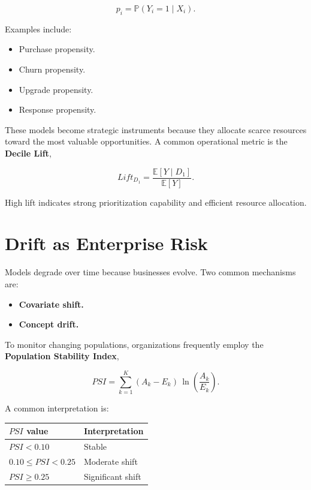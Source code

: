 \documentclass[
  a4paper,
  DIV=11,
  numbers=noendperiod]{scrartcl}
\newcounter{none} %
\providecommand{\tightlist}{%
  \setlength{\itemsep}{0pt}\setlength{\parskip}{0pt}}
\begin{document}
\[
p_i = \mathbb{P}(Y_i = 1 \mid X_i).
\]

Examples include:

\begin{itemize}
\tightlist
\item
  Purchase propensity.
\item
  Churn propensity.
\item
  Upgrade propensity.
\item
  Response propensity.
\end{itemize}

These models become strategic instruments because they allocate scarce
resources toward the most valuable opportunities. A common operational
metric is the \textbf{Decile Lift},

\[
Lift_{D_1} = \frac{\mathbb{E}[Y \mid D_1]}{\mathbb{E}[Y]}.
\]

High lift indicates strong prioritization capability and efficient
resource allocation.

\section{Drift as Enterprise Risk}\label{drift-as-enterprise-risk}

Models degrade over time because businesses evolve. Two common
mechanisms are:

\begin{itemize}
\tightlist
\item
  \textbf{Covariate shift.}
\item
  \textbf{Concept drift.}
\end{itemize}

To monitor changing populations, organizations frequently employ the
\textbf{Population Stability Index},

\[
PSI = \sum_{k=1}^{K} (A_k - E_k)\,
      \ln\!\left( \frac{A_k}{E_k} \right).
\]

A common interpretation is:

{\def\LTcaptype{none} %
\begin{longtable}[]{@{}ll@{}}
\toprule\noalign{}
\(PSI\) value & Interpretation \\
\midrule\noalign{}
\endhead
\bottomrule\noalign{}
\endlastfoot
\(PSI < 0.10\) & Stable \\
\(0.10 \le PSI < 0.25\) & Moderate shift \\
\(PSI \ge 0.25\) & Significant shift \\
\end{longtable}
}
\end{document}
